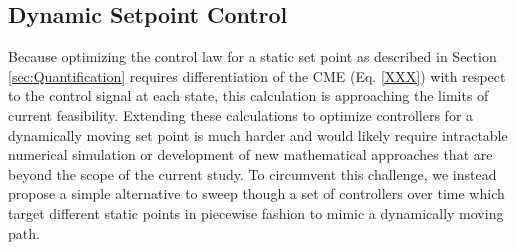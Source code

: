 \documentclass[12pt]{iopart}
\begin{document}

\subsection{Dynamic Setpoint Control}\label{sec:Dynamic}
Because optimizing the control law for a static set point as described in Section \ref{sec:Quantification} requires differentiation of the CME (Eq. \ref{XXX}) with respect to the control signal at each state, this calculation is approaching the limits of current feasibility.
Extending these calculations to optimize controllers for a dynamically moving set point is much harder and would likely require intractable numerical simulation or development of new mathematical approaches that are beyond the scope of the current study. 
To circumvent this challenge, we instead propose a simple alternative to sweep though a set of controllers over time which target different static points in piecewise fashion to mimic a dynamically moving path.
\end{document}
